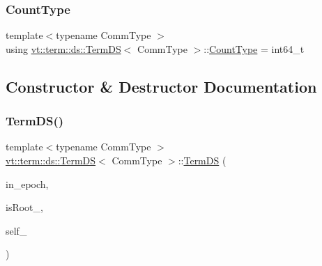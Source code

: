 \mbox{\label{structvt_1_1term_1_1ds_1_1_term_d_s_a54f4ebd7e1ecb59c32c0f5b03ef9f20b}} 
\subsubsection{\texorpdfstring{Count\+Type}{CountType}}
{\footnotesize\ttfamily template$<$typename Comm\+Type $>$ \\
using \hyperlink{structvt_1_1term_1_1ds_1_1_term_d_s}{vt\+::term\+::ds\+::\+Term\+DS}$<$ Comm\+Type $>$\+::\hyperlink{structvt_1_1term_1_1ds_1_1_term_d_s_a54f4ebd7e1ecb59c32c0f5b03ef9f20b}{Count\+Type} =  int64\+\_\+t}



\subsection{Constructor \& Destructor Documentation}
\mbox{\label{structvt_1_1term_1_1ds_1_1_term_d_s_a1873de7f6d3009bd997c64eefb46d9b5}} 
\subsubsection{\texorpdfstring{Term\+D\+S()}{TermDS()}\hspace{0.1cm}{\footnotesize\ttfamily [1/3]}}
{\footnotesize\ttfamily template$<$typename Comm\+Type $>$ \\
\hyperlink{structvt_1_1term_1_1ds_1_1_term_d_s}{vt\+::term\+::ds\+::\+Term\+DS}$<$ Comm\+Type $>$\+::\hyperlink{structvt_1_1term_1_1ds_1_1_term_d_s}{Term\+DS} (\begin{DoxyParamCaption}\item[{\hyperlink{namespacevt_a81d11b28122d43bf9834577e4a06440f}{Epoch\+Type}}]{in\+\_\+epoch,  }\item[{bool}]{is\+Root\+\_\+,  }\item[{\hyperlink{namespacevt_a866da9d0efc19c0a1ce79e9e492f47e2}{Node\+Type}}]{self\+\_\+ }\end{DoxyParamCaption})}

